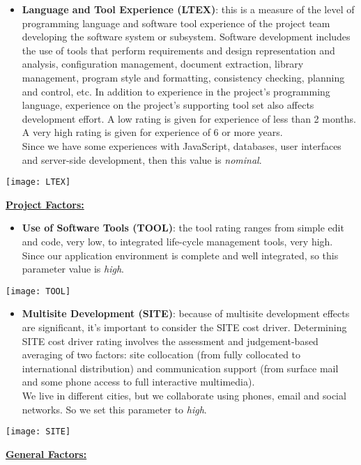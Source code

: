 \begin{itemize}
	\item \textbf{Language and Tool Experience (LTEX)}: this is a measure of the level of programming language and software tool experience of the project team developing the software system or subsystem. Software development includes the use of tools that perform requirements and design representation and analysis, configuration management, document extraction, library management, program style and formatting,
	consistency checking, planning and control, etc. In addition to experience in the project’s	programming language, experience on the project’s supporting tool set also affects development effort. A low rating is given for experience of less than 2 months. A very high rating is given for experience of 6 or more years. \\ Since we have some experiences with JavaScript, databases, user interfaces and server-side development, then this value is \textit{nominal}.
\end{itemize}
\begin{center}
	\texttt{[image: LTEX]}
\end{center}
\textbf{\underline{Project Factors:}}

\begin{itemize}
	\item \textbf{Use of Software Tools (TOOL)}: the tool rating ranges from simple edit and code, very low, to integrated life-cycle management tools, very high. \\ Since our application environment is complete and well integrated, so this parameter value is \textit{high}.
\end{itemize}
\begin{center}
	\texttt{[image: TOOL]}
\end{center}

\begin{itemize}
	\item \textbf{Multisite Development (SITE)}: because of multisite development effects are significant, it's important to consider the SITE cost driver. Determining SITE cost driver rating involves the assessment and judgement-based averaging of two factors: site collocation (from fully collocated to international distribution) and communication	support (from surface mail and some phone access to full interactive multimedia). \\ We live in different cities, but we collaborate using phones, email and social networks. So we set this parameter to \textit{high}.
\end{itemize}
\begin{center}
	\texttt{[image: SITE]}
\end{center}
\textbf{\underline{General Factors:}}

